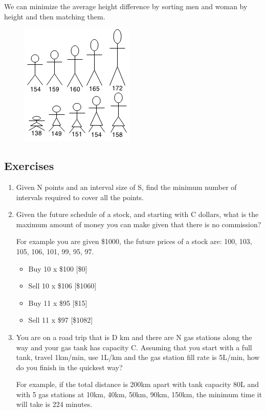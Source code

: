 \documentclass[11pt,oneside]{book}
\makeatletter
\def\maxwidth#1{\ifdim\Gin@nat@width>#1 #1\else\Gin@nat@width\fi}
\makeatother
\begin{document}
We can minimize the average height difference by sorting men and woman by height and then matching them.

\vspace{5px}\begin{figure}[H]\centering
        \includegraphics[width=0.66\maxwidth{\textwidth}]{couplematch2.png}
        \end{figure}

\subsection{Exercises}

\begin{enumerate}
\item Given N points and an interval size of S, find the minimum number of intervals required to cover all the points.
\item Given the future schedule of a stock, and starting with C dollars, what is the maximum amount of money you can make given that there is no commission?

For example you are given \$1000, the future prices of a stock are: 100, 103, 105, 106, 101, 99, 95, 97.

\begin{itemize}
\item Buy 10 x \$100 [\$0]
\item Sell 10 x \$106 [\$1060]
\item Buy 11 x \$95 [\$15]
\item Sell 11 x \$97 [\$1082]
\end{itemize}
\item You are on a road trip that is D km and there are N gas stations along the way and your gas tank has capacity C. Assuming that you start with a full tank, travel 1km/min, use 1L/km and the gas station fill rate is 5L/min, how do you finish in the quickest way?

For example, if the total distance is 200km apart with tank capacity 80L and with 5 gas stations at 10km, 40km, 50km, 90km, 150km, the minimum time it will take is 224 minutes.
\end{enumerate}

\newpage\null\thispagestyle{empty}\newpage
\end{document}

